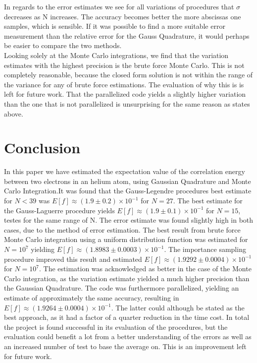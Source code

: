 \documentclass[%
reprint,nofootinbib,
amsmath,amssymb,
aps,
]{revtex4-1}
\begin{document}
In regards to the error estimates we see for all variations of procedures that $\sigma$ decreases as N increases. The accuracy becomes better the more abscissas one samples, which is sensible. If it was possible to find a more suitable error measurement than the relative error for the Gauss Quadrature, it would perhaps be easier to compare the two methods. \\ \indent 
Looking solely at the Monte Carlo integrations, we find that the variation estimates with the highest precision is the brute force Monte Carlo. This is not completely reasonable, because the closed form solution is not within the range of the variance for any of brute force estimations. The evaluation of why this is is left for future work. That the parallelized code yields a slightly higher variation than the one that is not parallelized is unsurprising for the same reason as states above. 

\section{Conclusion} \noindent 
In this paper we have estimated the expectation value of the correlation energy between two electrons in an helium atom, using Gaussian Quadrature and Monte Carlo Integration.It was found that the Gauss-Legendre procedures best estimate for $N<39$ was $E[f] \approx (1.9 \pm 0.2)\times 10^{-1}$ for $N=27$. The best estimate for the Gauss-Laguerre procedure yields $E[f]\approx (1.9 \pm 0.1)\times 10^{-1}$ for $N=15$, testes for the same range of N. The error estimate was found slightly high in both cases, due to the method of error estimation. The best result from brute force Monte Carlo integration using a uniform distribution function was estimated for $N=10^7$ yielding $E[f]\approx (1.8983 \pm 0.0003)\times 10^{-1}$. The importance sampling procedure improved this result and estimated $E[f]\approx (1.9292 \pm 0.0004)\times 10^{-1}$ for $N=10^7$. The estimation was acknowledged as better in the case of the Monte Carlo integration, as the variation estimate yielded a much higher precision than the Gaussian Quadrature. The code was furthermore parallelized, yielding an estimate of approximately the same accuracy, resulting in $E[f]\approx (1.9264 \pm 0.0004)\times 10^{-1}$. The latter could although be stated as the best approach, as it had a factor of a quarter reduction in the time cost. In total the project is found successful in its evaluation of the procedures, but the evaluation could benefit a lot from a better understanding of the errors as well as an increased number of test to base the average on. This is an improvement left for future work. 
\end{document}

